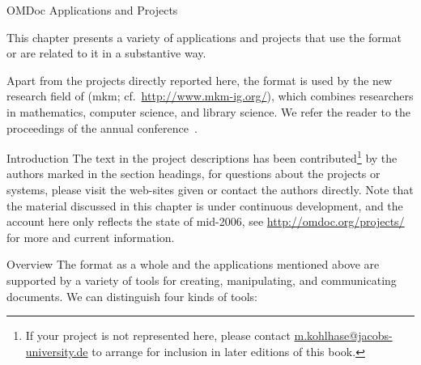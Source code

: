 
\begin{tchapter}[id=projects,short=Applications and Projects]{OMDoc Applications and Projects}

  This chapter presents a variety of applications and projects that use the {\omdoc}
  format or are related to it in a substantive way.  

  Apart from the projects directly reported here, the {\omdoc} format is used by the new
  research field of {} ({\sc mkm};
  cf.~\url{http://www.mkm-ig.org/}), which combines researchers in mathematics, computer
  science, and library science. We refer the reader to the proceedings of the annual
  {} conference~\cite{MKM01,MKM03,MKM04,MKM05,MKM06}.


\begin{tsection}[id=projeccts-intro]{Introduction}
  The text in the project descriptions has been contributed\footnote{If your {\omdoc}
    project is not represented here, please contact \url{m.kohlhase@jacobs-university.de} to arrange
    for inclusion in later editions of this book.} by the authors marked in the section
  headings, for questions about the projects or systems, please visit the web-sites given
  or contact the authors directly. Note that the material discussed in this chapter is
  under continuous development, and the account here only reflects the state of mid-2006,
  see \url{http://omdoc.org/projects/} for more and current information.


\begin{tsubsection}[id=projects-overview]{Overview}
  The {\omdoc} format as a whole and the applications mentioned above are supported by a
  variety of tools for creating, manipulating, and communicating {\omdoc} documents. We
  can distinguish four kinds of tools:


\end{tsubsection}
\end{tsection}
\end{tchapter}

